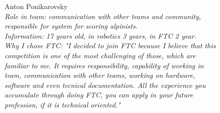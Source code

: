 \begin{figure}[H]
	\begin{minipage}[h]{0.47\linewidth}
	    Anton Ponikarovsky\\
		\emph{Role in team: communication with other teams and community, responsible for system for scoring alpinists. \\  }
		\emph{Information: 17 years old, in robotics 3 years, in FTC 2 year. \\}
		\emph{Why I chose FTC: "I decided to join FTC because I believe that this competition is one of the most challenging of those, which are familiar to me. It requires responsibility, capability of working in team, communication with other teams, working on hardware, software and even tecnical documentation. All the experience you accumulate through doing FTC, you can apply in your future profession, if it is technical oriented."}			
	\end{minipage}
	\hfill
	\begin{minipage}[h]{0.47\linewidth}
		\\
	\end{minipage}
\end{figure}

